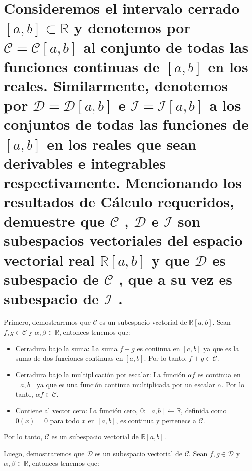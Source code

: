 \section{Consideremos el intervalo cerrado $[a, b] \subset  \mathbb{R}$ y denotemos por $\mathcal{C}  = \mathcal{C}[a, b]$ al conjunto de todas las funciones 
continuas de $[a, b]$ en los reales. Similarmente, denotemos por $\mathcal{D} = \mathcal{D}[a, b]$ e $\mathcal{I}  = \mathcal{I} [a, b]$ a los conjuntos de
todas las funciones de $[a, b]$ en los reales que sean derivables e integrables respectivamente. Mencionando
los resultados de Cálculo requeridos, demuestre que $\mathcal{C}$ , $\mathcal{D}$  e $\mathcal{I}$  son subespacios vectoriales del espacio
vectorial real $\mathbb{R}[a, b]$ y que $\mathcal{D}$  es subespacio de $\mathcal{C}$ , que a su vez es subespacio de $\mathcal{I}$ .}


Primero, demostraremos que $\mathcal{C}$ es un subespacio vectorial de $\mathbb{R}[a, b]$. Sean $f , g \in \mathcal{C}$ y $\alpha,\beta \in \mathbb{R}$, entonces tenemos que:

\begin{itemize}
    \item Cerradura bajo la suma: La suma $f + g$ es continua en $[a, b]$ ya que es la suma de dos funciones continuas en $[a, b]$. Por lo tanto, $f + g \in \mathcal{C}$.
    \item Cerradura bajo la multiplicación por escalar: La función $\alpha f$ es continua en $[a, b]$ ya que es una función continua multiplicada por un escalar $\alpha$. Por lo tanto, $\alpha f \in \mathcal{C}$.
    \item Contiene al vector cero: La función cero, $0: [a, b] \leftarrow \mathbb{R}$, definida como $0(x) = 0$ para todo $x$ en $[a, b]$, es continua y pertenece a $\mathcal{C}$.
\end{itemize}

Por lo tanto, $\mathcal{C}$ es un subespacio vectorial de $\mathbb{R}[a, b]$.

Luego, demostraremos que $\mathcal{D}$ es un subespacio vectorial de $\mathcal{C}$. Sean $f, g \in \mathcal{D}$ y $\alpha, \beta \in \mathbb{R}$, entonces tenemos que:

